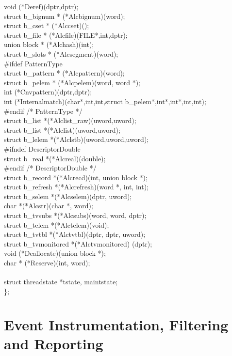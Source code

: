 \begin{iconcode}
   void (*Deref)(dptr,dptr);\\
   struct b\_bignum * (*Alcbignum)(word);\\
   struct b\_cset * (*Alccset)();\\
   struct b\_file * (*Alcfile)(FILE*,int,dptr);\\
   union block * (*Alchash)(int);\\
   struct b\_slots * (*Alcsegment)(word);\\
\#ifdef PatternType\\
   struct b\_pattern * (*Alcpattern)(word);\\
   struct b\_pelem * (*Alcpelem)(word, word *);\\
   int (*Cnvpattern)(dptr,dptr);\\
   int (*Internalmatch)(char*,int,int,struct b\_pelem*,int*,int*,int,int);\\
\#endif					/* PatternType */\\
   struct b\_list *(*Alclist\_raw)(uword,uword);\\
   struct b\_list *(*Alclist)(uword,uword);\\
   struct b\_lelem *(*Alclstb)(uword,uword,uword);\\
\#ifndef DescriptorDouble\\
   struct b\_real *(*Alcreal)(double);\\
\#endif					/* DescriptorDouble */\\
   struct b\_record *(*Alcrecd)(int, union block *);\\
   struct b\_refresh *(*Alcrefresh)(word *, int, int);\\
   struct b\_selem *(*Alcselem)(dptr, uword);\\
   char *(*Alcstr)(char *, word);\\
   struct b\_tvsubs *(*Alcsubs)(word, word, dptr);\\
   struct b\_telem *(*Alctelem)(void);\\
   struct b\_tvtbl *(*Alctvtbl)(dptr, dptr, uword);\\
   struct b\_tvmonitored *(*Alctvmonitored) (dptr);\\
   void (*Deallocate)(union block *);\\
   char * (*Reserve)(int, word);\\
\ \\
  struct threadstate *tstate, maintstate;\\
   \};
\end{iconcode}


\section{Event Instrumentation, Filtering and Reporting}

